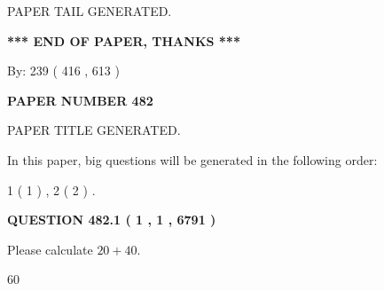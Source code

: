 \documentclass[12pt]{article}
\begin{document}
   
   
\vspace{2.0in} PAPER TAIL GENERATED.
   
   
   
   
\vspace{1.0in} 
{\textbf{\large{ *** END OF PAPER, THANKS *** }}} 
   
   
\hspace{1.0in} By: 
 239 ( 416 ,  613 )
   
   
   
   
\newpage 
\setcounter{page}{ 
   482001 } 
   
   
   
   
 {\textbf{ \Large{ PAPER NUMBER  482  }}}
   
   
\vspace{0.2in}
   
   
   
   
   
   
   
   
 \vspace{0.2in}
 
 
 
 
   
   
 PAPER TITLE GENERATED.
   
   
   
\vspace{0.2in}
   
In this paper, big questions will be generated in the following order: 
   
   
   1 ( 1 )
 ,
   2 ( 2 )
 .
  
\vspace{0.2in}
  
{\textbf{\Large{QUESTION
482.1 
 ( 1 , 1 , 6791 )
}}}
  
  
 
Please calculate $ %
20 +  %
40 $.
 
 
 
\noindent{}
 
 

60
 
 
\noindent{}
 
 

 
 
 
\noindent{}
 
\end{document}
